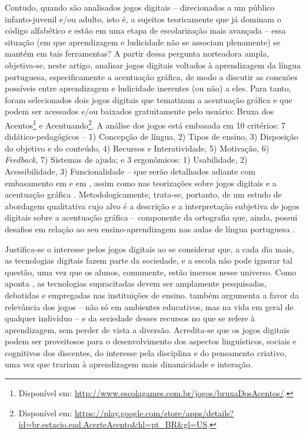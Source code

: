\documentclass{textolivre}
\begin{document}
Contudo, quando são analisados jogos digitais – direcionados a um público infanto-juvenil e/ou adulto, isto é, a sujeitos teoricamente que já dominam o código alfabético e estão em uma etapa de escolarização mais avançada – essa situação (em que aprendizagem e ludicidade não se associam plenamente) se mantém em tais ferramentas? A partir dessa pergunta norteadora ampla, objetiva-se, neste artigo, analisar jogos digitais voltados à aprendizagem da língua portuguesa, especificamente a acentuação gráfica, de modo a discutir as conexões possíveis entre aprendizagem e ludicidade inerentes (ou não) a eles. Para tanto, foram selecionados dois jogos digitais que tematizam a acentuação gráfica e que podem ser acessados e/ou baixados gratuitamente pelo usuário: Bruxa dos Acentos\footnote{Disponível em: \url{http://www.escolagames.com.br/jogos/bruxaDosAcentos/}.} e Acentuando\footnote{Disponível em: {\url{https://play.google.com/store/apps/details?id=br.estacio.ead.AcerteAcento&hl=pt_BR&gl=US}.}}. A análise dos jogos está embasada em 10 critérios: 7 didático-pedagógicos – 1) Concepção de língua, 2) Tipos de ensino, 3) Disposição do objetivo e do conteúdo, 4) Recursos e Interatividade, 5) Motivação, 6) \emph{Feedback}, 7) Sistemas de ajuda; e 3 ergonômicos: 1) Usabilidade, 2) Acessibilidade, 3) Funcionalidade – que serão detalhados adiante com embasamento em \textcite{ribeiro2009} e em \textcite{ribeiro2013}, assim como nas teorizações sobre jogos digitais \cite{gee2004, leffa2012, ribeiro2016} e a acentuação gráfica \cite{brasil2008, collischonn2005, marra2012, cristofaro2020, couto+guimaraes2020}. Metodologicamente, trata-se, portanto, de um estudo de abordagem qualitativa \cite{paiva2019} cujo alvo é a descrição e a interpretação subjetiva de jogos digitais sobre a acentuação gráfica – componente da ortografia que, ainda, possui desafios em relação ao seu ensino-aprendizagem nas aulas de língua portuguesa \cite{couto+guimaraes2020}.

Justifica-se o interesse pelos jogos digitais ao se considerar que, a cada dia mais, as tecnologias digitais fazem parte da sociedade, e a escola não pode ignorar tal questão, uma vez que os alunos, comumente, estão imersos nesse universo. Como aponta \textcite{coscarelli2016}, as tecnologias supracitadas devem ser amplamente pesquisadas, debatidas e empregadas nas instituições de ensino. \textcite{gee2004} também argumenta a favor da relevância dos jogos – não só em ambientes educativos, mas na vida em geral de qualquer indivíduo – e da seriedade desses recursos no que se refere à aprendizagem, sem perder de vista a diversão. Acredita-se que os jogos digitais podem ser proveitosos para o desenvolvimento dos aspectos linguísticos, sociais e cognitivos dos discentes, do interesse pela disciplina e do pensamento criativo, uma vez que trariam à aprendizagem mais dinamicidade e interação.
\end{document}
